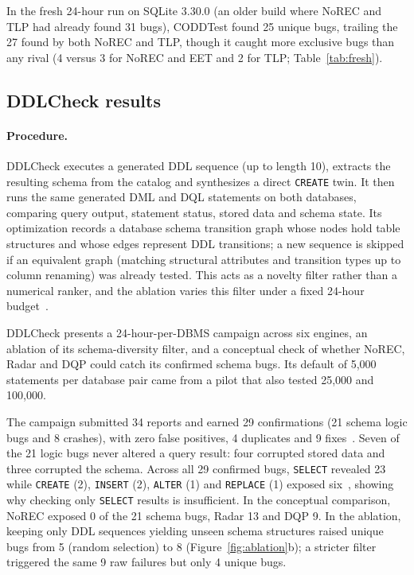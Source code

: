 In the fresh 24-hour run on SQLite 3.30.0 (an older build where NoREC and TLP had already found 31 bugs), CODDTest found 25 unique bugs, trailing the 27 found by both NoREC and TLP, though it caught more exclusive bugs than any rival (4 versus 3 for NoREC and EET and 2 for TLP; Table~\ref{tab:fresh}).

\begin{verdicts}
\end{verdicts}

\subsection{DDLCheck results}
\paragraph{Procedure.} DDLCheck executes a generated DDL sequence (up to length 10), extracts the resulting schema from the catalog and synthesizes a direct \texttt{CREATE} twin. It then runs the same generated DML and DQL statements on both databases, comparing query output, statement status, stored data and schema state. Its optimization records a database schema transition graph whose nodes hold table structures and whose edges represent DDL transitions; a new sequence is skipped if an equivalent graph (matching structural attributes and transition types up to column renaming) was already tested. This acts as a novelty filter rather than a numerical ranker, and the ablation varies this filter under a fixed 24-hour budget~\cite[Secs.~3.5, 4.4]{ddlcheck}.

DDLCheck presents a 24-hour-per-DBMS campaign across six engines, an ablation of its schema-diversity filter, and a conceptual check of whether NoREC, Radar and DQP could catch its confirmed schema bugs. Its default of 5,000 statements per database pair came from a pilot that also tested 25,000 and 100,000.

The campaign submitted 34 reports and earned 29 confirmations (21 schema logic bugs and 8 crashes), with zero false positives, 4 duplicates and 9 fixes~\cite[Table~2]{ddlcheck}. Seven of the 21 logic bugs never altered a query result: four corrupted stored data and three corrupted the schema. Across all 29 confirmed bugs, \texttt{SELECT} revealed 23 while \texttt{CREATE} (2), \texttt{INSERT} (2), \texttt{ALTER} (1) and \texttt{REPLACE} (1) exposed six~\cite[Fig.~6]{ddlcheck}, showing why checking only \texttt{SELECT} results is insufficient. In the conceptual comparison, NoREC exposed 0 of the 21 schema bugs, Radar 13 and DQP 9. In the ablation, keeping only DDL sequences yielding unseen schema structures raised unique bugs from 5 (random selection) to 8 (Figure~\ref{fig:ablation}b); a stricter filter triggered the same 9 raw failures but only 4 unique bugs.


